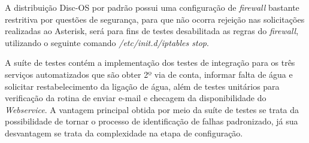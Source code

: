 A distribuição Disc-OS por padrão possui uma configuração de \textit{firewall} bastante restritiva por questões de segurança, para que não ocorra rejeição nas solicitações realizadas ao Asterisk, será para fins de testes desabilitada as regras do \textit{firewall}, utilizando o seguinte comando \textit{/etc/init.d/iptables stop}.
 
A suíte de testes contém a implementação dos testes de integração para os três serviços automatizados que são obter 2º via de conta, informar falta de água e solicitar restabelecimento da ligação de água, além de testes unitários para verificação da rotina de enviar e-mail e checagem da disponibilidade do \textit{Webservice}.
A vantagem principal obtida por meio da suíte de testes se trata da possibilidade de tornar o processo de identificação de falhas padronizado, já sua desvantagem se trata da complexidade na etapa de configuração.


